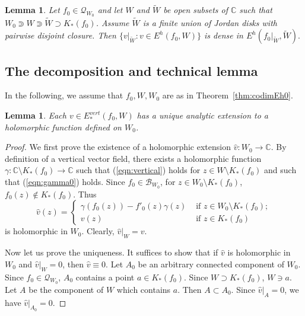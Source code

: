 \documentclass{amsart}
\numberwithin{equation}{section}
\newtheorem{lemma}[theorem]{Lemma}%
\newcommand{\C}{\mathbb C}
\theoremstyle{definition}
\theoremstyle{remark}
\begin{document}
\begin{lemma}\label{lem:dense} Let $f_0\in \mathcal{Q}_{W_0}$ and let $W$ and $\widetilde{W}$ be open subsets of $\C$ such that 
$W_0\Supset W\Supset \widetilde{W}\supset K_*(f_0)$. Assume $\widetilde{W}$ is a finite union of Jordan disks with pairwise disjoint closure. Then $\{v|_{\widetilde{W}}: v\in E^h(f_0, W)\}$ is dense in $E^h(f_0|_{\widetilde{W}},\widetilde{W}).$
\end{lemma}

\subsection{The decomposition and technical lemma}

In the following, we assume that $f_0, W, W_0$ are as in Theorem~\ref{thm:codimEh0}. 
\begin{lemma}\label{lem:verticalgamma}
Each $v\in E^{vert}_*(f_0,W)$ has a unique analytic extension to a holomorphic function defined on $W_0$. 
\end{lemma}


\begin{proof} 
We first prove the existence of a holomorphic extension $\widehat{v}: W_0\to \C$.  By definition of a vertical vector field, there exists a holomorphic function $\gamma:\C\setminus K_*(f_0)\to \C$ 
such that (\ref{eqn:vertical}) holds for $z\in W\setminus K_*(f_0)$ and such that (\ref{eqn:gamma0}) holds. 
Since $f_0\in 
\mathcal{B}_{W_0}$, for $z\in W_0\setminus K_*(f_0)$, $f_0(z)\not\in K_*(f_0)$. 
Thus
$$\widehat{v}(z)=\left\{\begin{array}{ll}
\gamma(f_0(z))-f'_0(z)\gamma(z)& \mbox{ if } z\in W_0\setminus K_*(f_0);\\
v(z) &\mbox{ if } z\in K_*(f_0)
\end{array}
\right.
$$
is holomorphic in $W_0$. Clearly, $\widehat{v}|_{W}=v$.


Now let us prove the uniqueness. It suffices to show that if $\widehat{v}$ is holomorphic in $W_0$ and $\widehat{v}|_{W}=0$, then $\widehat{v}\equiv 0.$
Let $A_0$ be an arbitrary connected component of $W_0$. Since $f_0\in \mathcal{Q}_{W_0}$, $A_0$ contains a point $a\in K_*(f_0)$. Since $W\supset K_*(f_0)$, $W\ni a$. Let $A$ be the component of $W$ which contains $a$. Then $A\subset A_0$. Since $\widehat{v}|_{A}=0$, we have $\widehat{v}|_{A_0}=0$. 
\end{proof}
\end{document}
